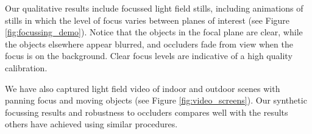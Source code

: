\documentclass{article} \usepackage{acra}
\begin{document}

Our qualitative results include focussed light field stills, including
animations of stills in which the level of focus varies between planes of
interest (see Figure \ref{fig:focussing_demo}). Notice that the objects in the
focal plane are clear, while the objects elsewhere appear blurred, and occluders
fade from view when the focus is on the background. Clear focus levels are
indicative of a high quality calibration.

We have also captured light field video of indoor and outdoor scenes
with panning focus and moving objects (see Figure \ref{fig:video_screens}). Our
synthetic focussing results and robustness to occluders compares well with the
results others have achieved using similar procedures.

\newpage
\end{document}
